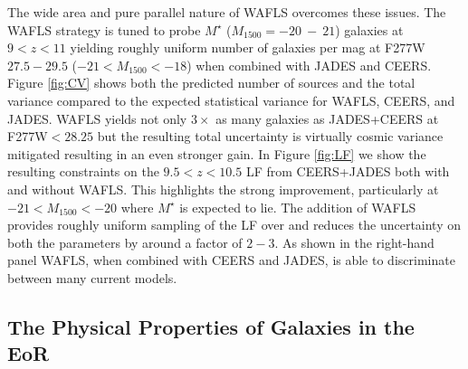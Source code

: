 \documentclass[12pt]{article}
\begin{document}
The wide area and pure parallel nature of WAFLS overcomes these issues. The WAFLS strategy is tuned to probe $M^{\star}$ ($M_{1500}=-20\ -\ 21$) galaxies at $9<z<11$ yielding roughly uniform number of galaxies per mag at F277W$27.5-29.5$ ($-21<M_{1500}<-18$) when combined with JADES and CEERS. Figure \ref{fig:CV} shows both the predicted number of sources and the total variance compared to the expected statistical variance for WAFLS, CEERS, and JADES. WAFLS yields not only $3\times$ as many galaxies as JADES+CEERS at F277W$<28.25$ but the resulting total uncertainty is virtually cosmic variance mitigated resulting in an even stronger gain. In Figure \ref{fig:LF} we show the resulting constraints on the $9.5<z<10.5$ LF from CEERS+JADES both with and without WAFLS. This highlights the strong improvement, particularly at $-21<M_{1500}<-20$ where $M^{\star}$ is expected to lie. The addition of WAFLS provides roughly uniform sampling of the LF over and reduces the uncertainty on both the parameters by around a factor of $2-3$. As shown in the right-hand panel WAFLS, when combined with CEERS and JADES, is able to discriminate between many current models. 


\subsection*{The Physical Properties of Galaxies in the EoR}\label{sec:properties}




\end{document}
